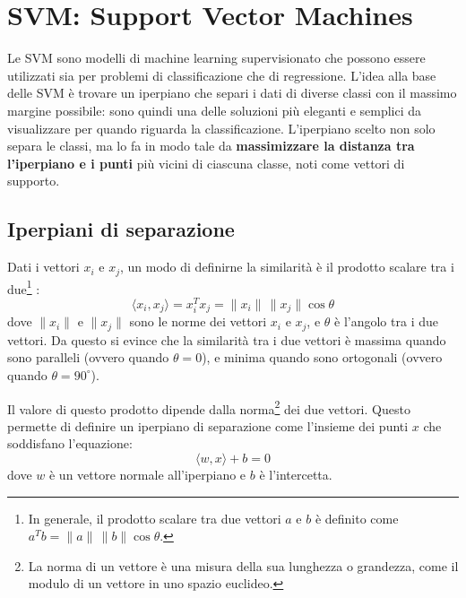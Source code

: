 \chapter{SVM: Support Vector Machines}\label{chap:svm}

Le SVM sono modelli di machine learning supervisionato che possono essere utilizzati sia per problemi di classificazione che di regressione.  L'idea alla base delle SVM è trovare un iperpiano che separi i dati di diverse classi con il massimo margine possibile: sono quindi una delle soluzioni più eleganti e semplici da visualizzare per quando riguarda la classificazione. L'iperpiano scelto non solo separa le classi, ma lo fa in modo tale da \textbf{massimizzare la distanza tra l'iperpiano e i punti} più vicini di ciascuna classe, noti come vettori di supporto. 

\section{Iperpiani di separazione}
Dati i vettori $x_i$ e $x_j$, un modo di definirne la similarità è il prodotto scalare tra i due\footnote{In generale, il prodotto scalare tra due vettori $a$ e $b$ è definito come $a^T b = \|a\| \, \|b\| \cos \theta$.} :
\[
\langle x_i, x_j \rangle = x_i^T x_j = \|x_i\| \, \|x_j\| \cos\theta
\]
dove $\|x_i\|$ e $\|x_j\|$ sono le norme dei vettori $x_i$ e $x_j$, e $\theta$ è l'angolo tra i due vettori. Da questo si evince che la similarità tra i due vettori è massima quando sono paralleli (ovvero quando $\theta = 0$), e minima quando sono ortogonali (ovvero quando $\theta = 90^\circ$).

Il valore di questo prodotto dipende dalla norma\footnote{La norma di un vettore è una misura della sua lunghezza o grandezza, come il modulo di un vettore in uno spazio euclideo.} dei due vettori. Questo permette di definire un iperpiano di separazione come l'insieme dei punti $x$ che soddisfano l'equazione:
\[
\langle w, x \rangle + b = 0
\]
dove $w$ è un vettore normale all'iperpiano e $b$ è l'intercetta.

